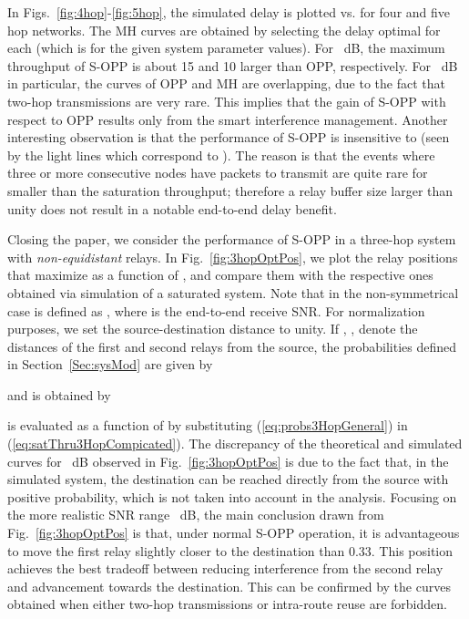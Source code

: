 \documentclass[draftclsnofoot,10pt,onecolumn,letterpaper]{IEEEtran}
\begin{document}
In Figs.~\ref{fig:4hop}-\ref{fig:5hop}, the simulated delay is plotted vs.  for four and five hop networks. The MH curves are obtained by selecting the delay optimal  for each  (which is  for the given system parameter values). For ~dB, the maximum throughput of S-OPP is about 15 and 10 larger than OPP, respectively.
For ~dB in particular, the curves of OPP and MH are overlapping, due to the fact that two-hop transmissions are very rare. This implies that the gain of S-OPP with respect to OPP 
results only from the smart interference management. Another interesting observation is that the performance of S-OPP is insensitive to  (seen by the light lines which correspond to ). The reason is that the events where three or more consecutive nodes have packets to transmit are quite rare for  smaller than the saturation throughput; therefore a relay buffer size larger than unity does not result in a notable end-to-end delay benefit.

Closing the paper, we consider the performance of S-OPP in a three-hop system with {\em non-equidistant} relays. In Fig.~\ref{fig:3hopOptPos}, we plot the relay positions 
that maximize  as a function of , and compare them with the respective ones obtained via simulation of a saturated system.
Note that  in the non-symmetrical case is defined as , where  is the end-to-end receive SNR.
For normalization purposes, we set the source-destination distance to unity. 
If , , denote the distances of the first and second relays from the source, the probabilities defined in Section~\ref{Sec:sysMod} are given by

and  is obtained by  

 is evaluated as a function of  by substituting (\ref{eq:probs3HopGeneral}) in (\ref{eq:satThru3HopCompicated}).
The discrepancy of the theoretical and simulated curves for ~dB observed in Fig.~\ref{fig:3hopOptPos} is due to the fact that, in the simulated system, the
destination can be reached directly from the source with positive probability, which is not taken into account in the analysis. 
Focusing on the more realistic SNR range ~dB, the main conclusion drawn from 
Fig.~\ref{fig:3hopOptPos} is that, under normal S-OPP operation, it is advantageous to move the first relay slightly closer to the destination than 0.33. This position achieves the best tradeoff between reducing interference from the second relay and advancement towards the destination. This can be confirmed by the curves obtained when either two-hop transmissions or intra-route reuse are forbidden.
\end{document}
